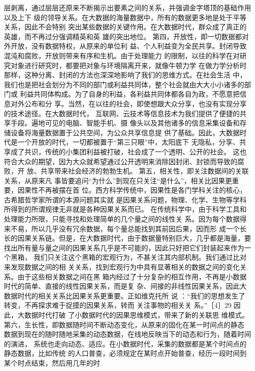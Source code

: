 \documentclass[11pt]{ctexart}
\begin{document}
{{{{层剥离，通过层层还原来不断揭示出要素之间的关系，并强调金字塔顶的基础作用以及上下
级的领导关系。在大数据的海量数据中，所有的数据更多地是处于平等关系，因此不会特别
突出某些数据的关键作用。在大数据时代，群众成了真正的英雄，而不再过分强调精英和英
雄的突出地位。 第四，开放性，即一切数据都对外开放，没有数据特权，从原来的单位利
益、个人利益变为全民共享。封闭导致混沌和腐败，开放则带来有序和生机。由于处理能力
的限制，以往的科学在对研究对象进行研究时，都要把对象与环境隔离开来，就像牛顿力学
在做力学分析时那样，这种分离、封闭的方法也深深地影响了我们的思维方式。在社会生活
中，我们也是把社会划分为不同的部门或利益共同体，整个社会就由大大小小诸多的部门或
利益共同体构成。为了自身的利益，各利益共同体都各自为政，不愿意把信息对外公布和分
享。当然，在以往的社会，即使想跟大众分享，也没有实现分享的技术途径。在大数据时代，
互联网、云技术等信息技术为我们提供了便捷的共享手段。遍地可见的电脑、智能手机、摄
像头以及其他诸多的信息采集设备和存储设备将海量数据置于公共空间，为公众共享信息提
供了基础。因此，大数据时代是一个开放的时代，一切都被置于“第三只眼”中，太阳底下
无隐私，分享、共享成了共识，传统的小集团利益被打破，社会成了一个透明、公开的社会。
这也符合大众的期望，因为大众就希望通过公开透明来消除因封闭、封锁而导致的腐败，开
放、共享带来社会经济的勃勃生机。 第五，相关性，即关注数据间的关联关系，从原来凡
事皆要追问“为什么”到现在只关注“是什么”，相关比因果更重要，因果性不再被摆在首
位。西方科学传统中，因果性是各门学科关注的核心，古希腊哲学家所谓的本源问题其实就
是因果关系问题，物理、化学、生物等学科所得到的所谓规律无非就是各种因果关系而已。
在传统科学中，由于科学工具和处理能力所限，只能寻找和处理简单的几个量之间的线性关
系。因为每个数据得来不易，所以几乎没有冗余数据，每个量总能找到其前因后果，因而形
成一个长长的因果关系链。但是，在大数据时代，由于数据量特别巨大，几乎都是海量，要
找出所有量与量之间的因果关系几乎是不可能的，因此只好把它们封装起来作为一个黑箱，
我们只关注这个黑箱的宏观行为，不甚关注其内部机制。我们通过比对来发现数据之间的相
关关系，找到宏观行为中具有显著相关的数据之间的变化关系。由于这些相关数据之间在黑
箱内经过了十分复杂的相互作用，不再是小数据时代的简单、直接的线性因果关系，而是复
杂、间接的非线性因果关系，因此大数据时代的相关关系比因果关系更重要。正如维克托所
说 ：“我们的思想发生了转变，不再探求难于捉摸的因果关系，转而 关注事物的相关关
系。”［4］29 因此，大数据时代打破 了小数据时代的因果思维模式，带来了新的关联思
维模式。 第六，生长性，即数据随时间不断动态变化，从原来的固化在某一时间点的静态
数据到现在的随时随地采集的动态数据，在线地反映当下的动态和行为，随着时间的演进，
系统也走向动态、适应。在小数据时代，采集的数据都是某个时间点的静态数据，比如传统
的人口普查，必须规定在某时点开始普查，经历一段时间到某个时点结束，然后用几年的时
}}}}
\end{document}
